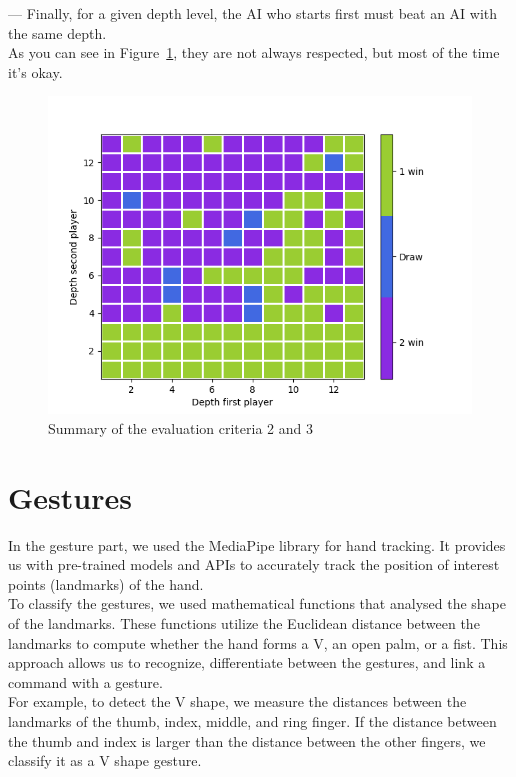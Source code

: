 \documentclass[12pt, a4paper, oneside]{report}
\begin{document}
	— Finally, for a given depth level, the AI who starts first must beat an AI with the same depth. \\

	As you can see in Figure~\ref{fig:summary_criteria}, they are not always respected, but most of the time it's okay.
	\begin{figure}[h]
		\includegraphics[scale=1]{result_criteria.png}
		\centering
		\caption{Summary of the evaluation criteria 2 and 3}\label{fig:summary_criteria}
	\end{figure}

	\section{Gestures}
	In the gesture part, we used the MediaPipe library for hand tracking. It provides us with pre-trained models and APIs to accurately track the position of interest points (landmarks) of the hand. \\

	To classify the gestures, we used mathematical functions that analysed the shape of the landmarks. These functions utilize the Euclidean distance between the landmarks to compute whether the hand forms a V, an open palm, or a fist. This approach allows us to recognize, differentiate between the gestures, and link a command with a gesture. \\
	For example, to detect the V shape, we measure the distances between the landmarks of the thumb, index, middle, and ring finger. If the distance between the thumb and index is larger than the distance between the other fingers, we classify it as a V shape gesture. \\
\end{document}
